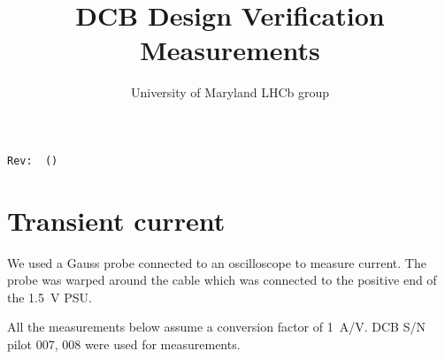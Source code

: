 \documentclass[11pt,letterpaper]{refart}
\title{DCB Design Verification Measurements}
\author{University of Maryland LHCb group}
\begin{document}
\maketitle
\hfill\small{\texttt{Rev:~\gitRel~(\gitAbbrevHash)}}
\tableofcontents
\listoffigures
\newpage


\section{Transient current}
We used a Gauss probe connected to an oscilloscope to measure current.
The probe was warped around the cable which was connected to the positive end of
the \SI{1.5}{\volt} PSU.

All the measurements below assume a conversion factor of \SI{1}{\ampere/\volt}.
DCB S/N pilot 007, 008 were used for measurements.
\end{document}
